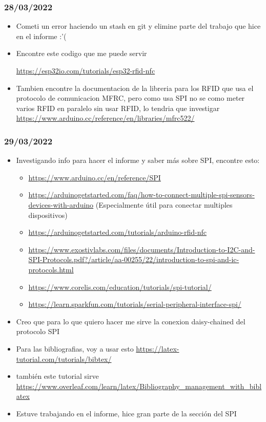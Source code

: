 \documentclass[../informe_krapp.tex]{subfiles}
\begin{document}
\subsubsection*{28/03/2022}
\begin{itemize}
	\item Cometi un error haciendo un stash en git y elimine parte del trabajo que hice
	      en el informe :'(
	\item Encontre este codigo que me puede servir

	      \url{https://esp32io.com/tutorials/esp32-rfid-nfc}
	\item Tambien encontre la documentacion de la libreria para los RFID que usa el
	      protocolo de comunicacion MFRC, pero como usa SPI no se como meter varios RFID en
	      paralelo sin usar RFID, lo tendria que investigar
	      \url{https://www.arduino.cc/reference/en/libraries/mfrc522/}
\end{itemize}

\subsubsection*{29/03/2022}
\begin{itemize}
	\item Investigando info para hacer el informe y saber más sobre SPI, encontre esto:
	      \begin{itemize}
		      \item \url{https://www.arduino.cc/en/reference/SPI}
		      \item \url{https://arduinogetstarted.com/faq/how-to-connect-multiple-spi-sensors-devices-with-arduino} (Especialmente útil para conectar multiples dispositivos)
		      \item \url{https://arduinogetstarted.com/tutorials/arduino-rfid-nfc}
		      \item \url{https://www.exostivlabs.com/files/documents/Introduction-to-I2C-and-SPI-Protocols.pdf?/article/aa-00255/22/introduction-to-spi-and-ic-protocols.html}
		      \item \url{https://www.corelis.com/education/tutorials/spi-tutorial/}
		      \item \url{https://learn.sparkfun.com/tutorials/serial-peripheral-interface-spi/}
	      \end{itemize}
	\item Creo que para lo que quiero hacer me sirve la conexion daisy-chained
	      del protocolo SPI
	\item Para las bibliografias, voy a usar esto \url{https://latex-tutorial.com/tutorials/bibtex/}
	\item también este tutorial sirve \url{https://www.overleaf.com/learn/latex/Bibliography_management_with_biblatex}
	\item Estuve trabajando en el informe, hice gran parte de la sección del SPI

\end{itemize}
\end{document}
